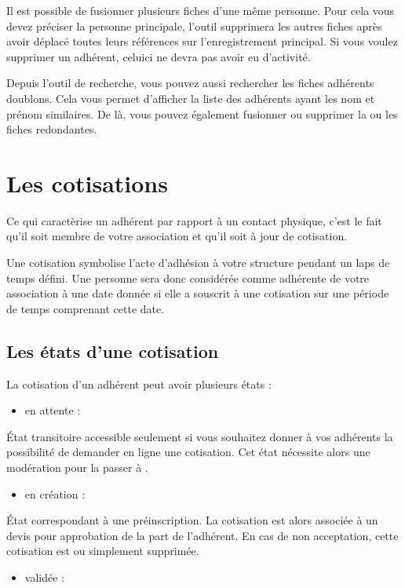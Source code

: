 \documentclass[a4paper,10pt,oneside,french]{sphinxmanual}
\begin{document}
Il est possible de fusionner plusieurs fiches d’une même personne.
Pour cela vous devez préciser la personne principale, l’outil supprimera les autres fiches après avoir déplacé toutes leurs références sur l’enregistrement principal.
Si vous voulez supprimer un adhérent, celui\sphinxhyphen{}ci ne devra pas avoir eu d’activité.

Depuis l’outil de recherche, vous pouvez aussi rechercher les fiches adhérents doublons. Cela vous permet d’afficher la liste des adhérents ayant les nom et prénom similaires.
De là, vous pouvez également fusionner ou supprimer la ou les fiches redondantes.


\section{Les cotisations}
\label{\detokenize{member/subscription:les-cotisations}}\label{\detokenize{member/subscription::doc}}
Ce qui caractèrise un adhérent par rapport à un contact physique, c’est le fait qu’il soit membre de votre association et qu’il soit à jour de cotisation.

Une cotisation symbolise l’acte d’adhésion à votre structure pendant un laps de temps défini.
Une personne sera donc considérée comme adhérente de votre association à une date donnée si elle a souscrit à une cotisation sur une période de temps comprenant cette date.


\subsection{Les états d’une cotisation}
\label{\detokenize{member/subscription:les-etats-d-une-cotisation}}
La cotisation d’un adhérent peut avoir plusieurs états :
\begin{itemize}
\item {} 
en attente :

\end{itemize}

État transitoire accessible seulement si vous souhaitez donner à vos adhérents la possibilité de demander en ligne une cotisation.
Cet état nécessite alors une modération pour la passer à .
\begin{itemize}
\item {} 
en création :

\end{itemize}

État correspondant à une préinscription.
La cotisation est alors associée à un devis pour approbation de la part de l’adhérent.
En cas de non acceptation, cette cotisation est  ou simplement supprimée.
\begin{itemize}
\item {} 
validée :

\end{itemize}
\end{document}
